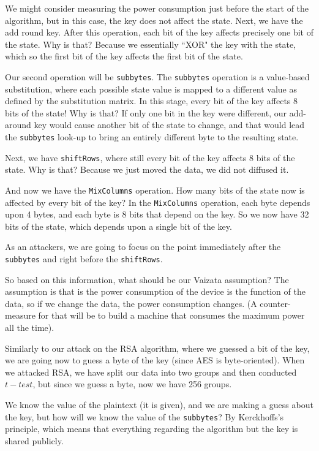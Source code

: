 We might consider measuring the power consumption just before the start of the algorithm, but in this case, the key does not affect the state.
Next, we have the add round key. 
After this operation, each bit of the key affects precisely one bit of the state.
Why is that? 
Because we essentially ``XOR" the key with the state, which so the first bit of the key affects the first bit of the state.

Our second operation will be \texttt{subbytes}. 
The \texttt{subbytes} operation is a value-based substitution, where each possible state value is mapped to a different value as defined by the substitution matrix. 
In this stage, every bit of the key affects 8 bits of the state! Why is that? 
If only one bit in the key were different, our add-around key would cause another bit of the state to change, and that would lead the \texttt{subbytes} look-up to bring an entirely different byte to the resulting state.

Next, we have \texttt{shiftRows}, where still every bit of the key affects 8 bits of the state. 
Why is that? 
Because we just moved the data, we did not diffused it.

And now we have the \texttt{MixColumns} operation. 
How many bits of the state now is affected by every bit of the key? 
In the \texttt{MixColumns} operation, each byte depends upon 4 bytes, and each byte is 8 bits that depend on the key. 
So we now have 32 bits of the state, which depends upon a single bit of the key.

As an attackers, we are going to focus on the point immediately after the \texttt{subbytes} and right before the \texttt{shiftRows}. 

So based on this information, what should be our Vaizata assumption?
The assumption is that is the power consumption of the device is the function of the data, so if we change the data, the power consumption changes.
(A counter-measure for that will be to build a machine that consumes the maximum power all the time).

Similarly to our attack on the RSA algorithm, where we guessed a bit of the key, we are going now to guess a byte of the key (since AES is byte-oriented). 
When we attacked RSA, we have split our data into two groups and then conducted $t-test$, but since we guess a byte, now we have 256 groups.

We know the value of the plaintext (it is given), and we are making a guess about the key, but how will we know the value of the \texttt{subbytes}? 
By Kerckhoffs's principle, which means that everything regarding the algorithm but the key is shared publicly.

